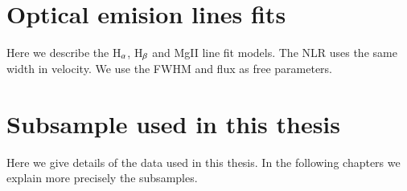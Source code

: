 \section{Optical emision lines fits}
\label{sec3:lines}

Here we describe the H$_{\rm \alpha}$, H$_{\rm \beta}$ and MgII line fit models. The NLR uses the same width in velocity. We use the FWHM and flux as free parameters.


\section{Subsample used in this thesis}
\label{sec3:sample}

Here we give details of the data used in this thesis. In the following chapters we explain more precisely the subsamples.